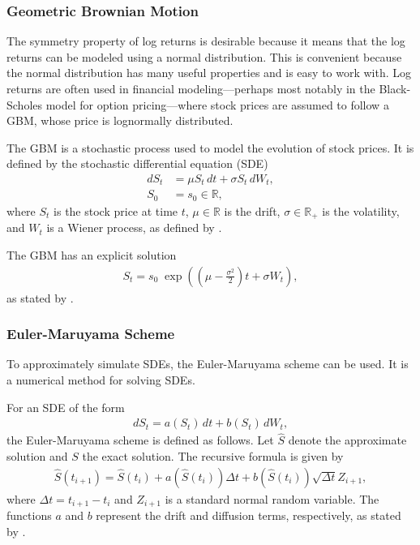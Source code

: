 \subsubsection{Geometric Brownian Motion}
The symmetry property of log returns is desirable because it means that the log returns can be modeled using a normal distribution. This is convenient because the normal distribution has many useful properties and is easy to work with. Log returns are often used in financial modeling—perhaps most notably in the Black-Scholes model for option pricing—where stock prices are assumed to follow a \gls{GBM}, whose price is lognormally distributed. 

The \gls{GBM} is a stochastic process used to model the evolution of stock prices. It is defined by the stochastic differential equation (SDE)
\begin{align*}
    dS_t &= \mu S_t \,dt + \sigma S_t \,dW_t, \\
    S_0 &= s_0 \in \mathbb{R},
\end{align*}
where $S_t$ is the stock price at time $t$, $\mu \in \mathbb{R}$ is the drift, $\sigma \in \mathbb{R}_+$ is the volatility, and $W_t$ is a Wiener process, as defined by \citet[p.~68]{Bjork2019Edition4}.

The \gls{GBM} has an explicit solution
\begin{align*}
    S_t = s_0 \; \exp\left( \left( \mu - \frac{\sigma^2}{2} \right)t + \sigma W_t \right),
\end{align*}
as stated by .

\subsubsection{Euler-Maruyama Scheme}\label{sec:EulerMaruyama}
To approximately simulate \gls{SDE}s, the Euler-Maruyama scheme can be used. It is a numerical method for solving \gls{SDE}s.

For an \gls{SDE} of the form
\begin{align*}
    dS_t = a(S_t)\,dt + b(S_t)\,dW_t,
\end{align*}
the Euler-Maruyama scheme is defined as follows. Let $\hat{S}$ denote the approximate solution and $S$ the exact solution. The recursive formula is given by
\begin{align*}
    \hat{S}(t_{i+1}) = \hat{S}(t_i) + a(\hat{S}(t_i)) \Delta t + b(\hat{S}(t_i)) \sqrt{\Delta t} Z_{i+1},
\end{align*}
where $\Delta t = t_{i+1} - t_i$ and $Z_{i+1}$ is a standard normal random variable. The functions $a$ and $b$ represent the drift and diffusion terms, respectively, as stated by \citet[pp.~339--340]{glasserman2004monte}.

